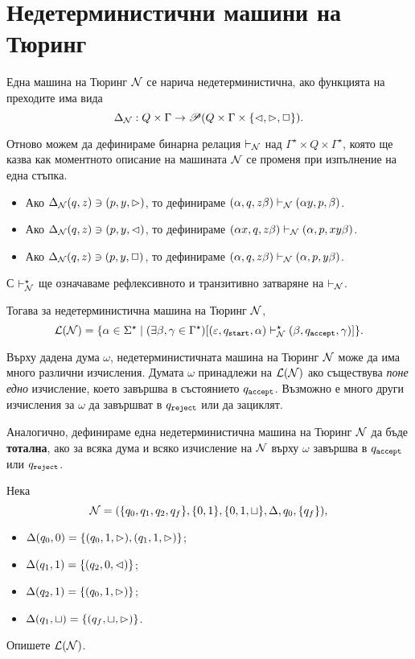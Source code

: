 \section{Недетерминистични машини на Тюринг}

Една машина на Тюринг $\mathcal{N}$ се нарича недетерминистична, ако функцията на преходите има вида
\[\Delta_{\mathcal{N}}: Q\times \Gamma \to \mathscr{P}(Q \times \Gamma\times \{\lhd,\rhd,\Box\}). \]

Отново можем да дефинираме бинарна релация $\vdash_{\mathcal{N}}$ над $\Gamma^\star \times Q \times \Gamma^\star$,
която ще казва как моментното описание на машината $\mathcal{N}$ се променя при изпълнение на една стъпка.
\begin{itemize}
\item
  Ако $\Delta_{\mathcal{N}}(q,z) \ni (p,y,\rhd)$, то дефинираме $(\alpha, q, z\beta) \vdash_{\mathcal{N}} (\alpha y, p, \beta)$.
\item 
  Ако $\Delta_{\mathcal{N}}(q,z) \ni (p,y,\lhd)$, то дефинираме $(\alpha x, q, z\beta) \vdash_{\mathcal{N}} (\alpha , p, xy\beta)$.
\item 
  Ако $\Delta_{\mathcal{N}}(q,z) \ni (p,y,\Box)$, то дефинираме $(\alpha, q, z\beta) \vdash_{\mathcal{N}} (\alpha, p, y\beta)$.
\end{itemize}
С $\vdash^\star_{\mathcal{N}}$ ще означаваме рефлексивното и транзитивно затваряне на $\vdash_{\mathcal{N}}$.

Тогава за недетерминистична машина на Тюринг $\mathcal{N}$, 
\[\mathcal{L}(\mathcal{N}) = \{\alpha\in\Sigma^\star \mid (\exists \beta,\gamma \in \Gamma^\star)[(\varepsilon, q_{\texttt{start}}, \alpha) \vdash^\star_{\mathcal{N}} (\beta, q_{\texttt{accept}}, \gamma) ]\}.\]

\begin{remark}
  Върху дадена дума $\omega$, недетерминистичната машина на Тюринг $\mathcal{N}$ може да има много различни изчисления.
  Думата $\omega$ принадлежи на $\mathcal{L}(\mathcal{N})$ ако съществува {\em поне едно} изчисление, което завършва в състоянието $q_{\texttt{accept}}$.
  Възможно е много други изчисления за $\omega$ да завършват в $q_{\texttt{reject}}$ или да зациклят.
\end{remark}

Аналогично, дефинираме една недетерминистична машина на Тюринг $\mathcal{N}$ да бъде {\bf тотална}, ако за всяка дума и 
всяко изчисление на $\mathcal{N}$ върху $\omega$ завършва в $q_{\texttt{accept}}$ или $q_{\texttt{reject}}$.

\begin{problem}
  Нека
  \[\mathcal{N} = (\{q_0,q_1,q_2,q_f\}, \{0,1\}, \{0,1,\sqcup\}, \Delta, q_0, \{q_f\}),\]
  \begin{itemize}
  \item 
    $\Delta(q_0,0) = \{(q_0,1,\rhd),(q_1,1,\rhd)\}$;
  \item
    $\Delta(q_1,1) = \{(q_2,0,\lhd)\}$;
  \item
    $\Delta(q_2,1) = \{(q_0,1,\rhd)\}$;
  \item
    $\Delta(q_1,\sqcup) = \{(q_f,\sqcup,\rhd)\}$.
  \end{itemize}
  Опишете $\mathcal{L}(\mathcal{N})$.
\end{problem}


